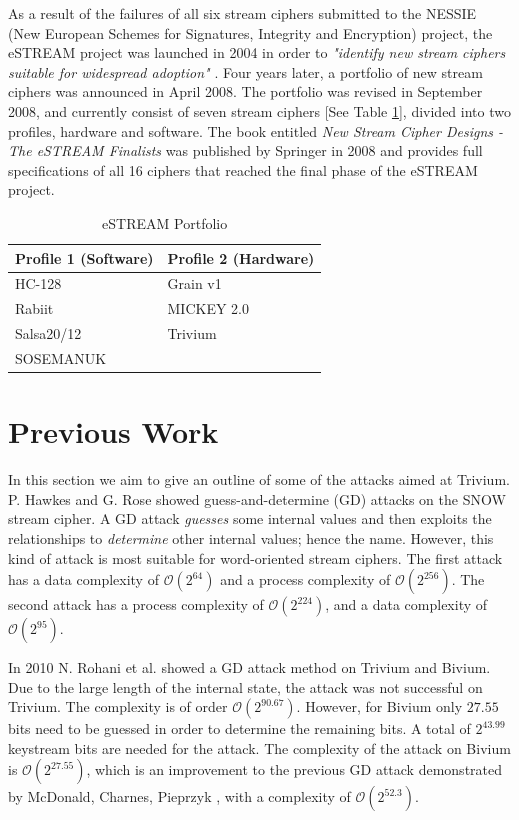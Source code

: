 \documentclass[conference]{IEEEtran}
\begin{document}
As a result of the failures of all six stream ciphers submitted to the NESSIE (New European Schemes for Signatures, Integrity and Encryption) project, the eSTREAM project was launched in 2004 in order to \textit{"identify new stream ciphers suitable for widespread adoption"} \cite{call}. Four years later, a portfolio of new stream ciphers was announced in April 2008. The portfolio was revised in September 2008, and currently consist of seven stream ciphers [See Table \ref{tab:portfolio}], divided into two profiles, hardware and software. The book entitled \textit{New Stream Cipher Designs - The eSTREAM Finalists} \cite{book} was published by Springer in 2008 and provides full specifications of all 16 ciphers that reached the final phase of the eSTREAM project.
\begin{table}[H]
\centering
\begin{tabular}{|l|l|}\hline
Profile 1 (Software) & Profile 2 (Hardware)\\\hline
HC-128 & Grain v1\\
Rabiit & MICKEY 2.0\\
Salsa20/12 & Trivium\\
SOSEMANUK & \\\hline
\end{tabular}
\caption{eSTREAM Portfolio}
\label{tab:portfolio}
\end{table}

\section{Previous Work}

In this section we aim to give an outline of some of the attacks aimed at Trivium. 
P. Hawkes and G. Rose showed guess-and-determine (GD) attacks on the SNOW stream cipher. A GD attack \textit{guesses} some internal values and then exploits the relationships to \textit{determine} other internal values; hence the name. However, this kind of attack is most suitable for word-oriented stream ciphers. The first attack has a data complexity of $\mathcal{O}(2^{64})$ and a process complexity of $\mathcal{O}(2^{256})$. The second attack has a process complexity of $\mathcal{O}(2^{224})$, and a data complexity of $\mathcal{O}(2^{95})$.\cite{Hawkes2003}

In 2010 N. Rohani et al. showed a GD attack method on Trivium and Bivium. \cite{Rohani2010} Due to the large length of the internal state, the attack was not successful on Trivium. The complexity is of order $\mathcal{O}(2^{90.67})$. However, for Bivium only $27.55$ bits need to be guessed in order to determine the remaining bits. A total of $2^{43.99}$ keystream bits are needed for the attack. The complexity of the attack on Bivium is $\mathcal{O}(2^{27.55})$, which is an improvement to the previous GD attack demonstrated by McDonald, Charnes, Pieprzyk \cite{biv-old}, with a complexity of $\mathcal{O}(2^{52.3})$.
\end{document}
